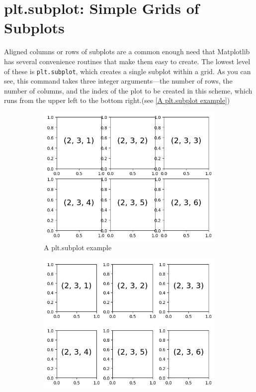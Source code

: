 \section{plt.subplot: Simple Grids of Subplots}
Aligned columns or rows of subplots are a common enough need that Matplotlib has
several convenience routines that make them easy to create. The lowest level of these
is \verb|plt.subplot|, which creates a single subplot within a grid. As you can see, this
command takes three integer arguments—the number of rows, the number of columns, and the index of the plot to be created in this scheme, which runs from the
upper left to the bottom right.(see \autoref{A plt.subplot example})

\begin{figure}
    \centering
    \begin{subfigure}[b]{.45\textwidth}
        \includegraphics[width=\textwidth]{../Figures/A plt.subplot example.png}
        \caption{A plt.subplot example}
        \label{A plt.subplot example}
    \end{subfigure}
    \hfill
    \begin{subfigure}[b]{.45\textwidth}
        \includegraphics[width=\textwidth]{../Figures/plt.subplot with adjusted margins.png}

\end{subfigure}
\end{figure}
